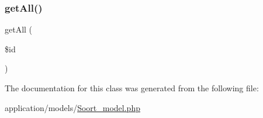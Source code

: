 \subsubsection{\texorpdfstring{get\+All()}{getAll()}}
{\footnotesize\ttfamily get\+All (\begin{DoxyParamCaption}\item[{}]{\$id }\end{DoxyParamCaption})}



The documentation for this class was generated from the following file\+:\begin{DoxyCompactItemize}
\item 
application/models/\mbox{\hyperlink{_soort__model_8php}{Soort\+\_\+model.\+php}}\end{DoxyCompactItemize}
